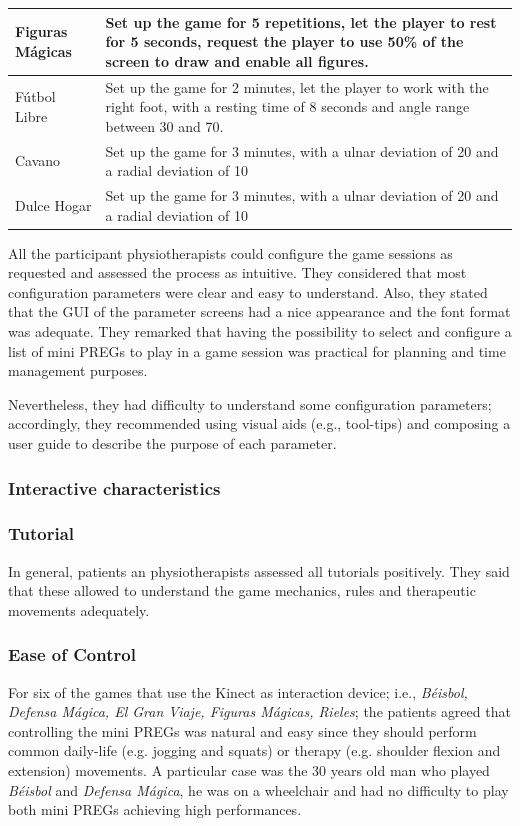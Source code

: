 \begin{table}[tbh]
{\begin{tabular}{lp{16cm}}
Figuras Mágicas
& Set up the game for 5 repetitions, let the player to rest for 5 seconds, request the player to use 50\% of the screen to draw and enable all figures. 
\\\midrule
F\'utbol Libre
& Set up the game for 2 minutes, let the player to work with the right foot, with a resting time of 8 seconds and angle range between 30 and 70.
\\\midrule
Cavano
& Set up the game for 3 minutes, with a ulnar deviation of 20 and a radial deviation of 10
\\\midrule
Dulce Hogar
& Set up the game for 3 minutes, with a ulnar deviation of 20 and a radial deviation of 10
\\
\bottomrule
\end{tabular}}
\label{tab:configurations}
\end{table}

All the participant physiotherapists could configure the game sessions as requested and assessed the process as intuitive. They considered that most configuration parameters were clear and easy to understand. Also, they stated that the \ac{GUI} of the parameter screens had a nice appearance and the font format was adequate. They remarked that having the possibility to select and configure a list of mini \acp{PREG} to play in a game session was practical for planning and time management purposes.

Nevertheless, they had difficulty to understand some configuration parameters; accordingly, they recommended using visual aids (e.g., tool-tips) and composing a user guide to describe the purpose of each parameter.

\subsubsection{Interactive characteristics}
\subsubsection*{Tutorial}
In general, patients an physiotherapists assessed all tutorials positively. They said that these allowed to understand the game mechanics, rules and therapeutic movements adequately.

\subsubsection*{Ease of Control}
For six of the games that use the Kinect as interaction device; i.e., \textit{B\'eisbol, Defensa M\'agica, El Gran Viaje, Figuras Mágicas, Rieles}; the patients agreed that controlling the mini \acp{PREG} was natural and easy since they should perform common daily-life (e.g. jogging and squats) or therapy (e.g. shoulder flexion and extension) movements. A particular case was the 30 years old man who played \textit{B\'eisbol} and \textit{Defensa M\'agica}, he was on a wheelchair and had no difficulty to play both mini \acp{PREG} achieving high performances.

